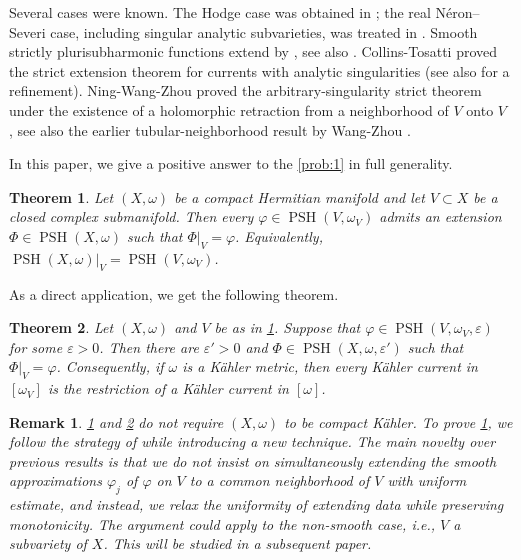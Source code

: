 \documentclass[12pt,reqno]{amsart}
\newtheorem{thm}{Theorem}[section]
\newtheorem{rem}{Remark}[section]
\newcommand{\PSH}{\operatorname{PSH}}
\newcommand{\restr}[2]{\left.#1\right|_{#2}}
\begin{document}
	Several cases were known. The Hodge case was obtained in \cite{CGZ13}; the real N\'eron--Severi case, including singular analytic subvarieties, was treated in \cite{CGZ22}. Smooth strictly plurisubharmonic functions extend by \cite[Proposition~2.1]{CGZ13}, see also \cite{Sch98}. Collins-Tosatti proved the strict extension theorem for currents with analytic singularities \cite{CT14} (see also \cite{DRWXZ26} for a refinement). Ning-Wang-Zhou proved the arbitrary-singularity strict theorem under the existence of a holomorphic retraction from a neighborhood of $V$ onto $V$ \cite{NWZ24}, see also the earlier tubular-neighborhood result by Wang-Zhou \cite{WZ}.
	
	In this paper, we give a positive answer to the \cref{prob:1} in  full generality.
	
	\begin{thm}\label{thm:main}
		Let $(X,\omega)$ be a compact Hermitian manifold and let $V\subset X$ be a closed complex submanifold. Then every $\varphi\in\PSH(V,\omega_V)$ admits an extension $\Phi\in\PSH(X,\omega)$ such that $\restr{\Phi}{V}=\varphi$.
		Equivalently, $\PSH(X,\omega)|_V=\PSH(V,\omega_V)$.
	\end{thm}
	
	As a direct application, we get the following theorem.
	
	\begin{thm}\label{thm:strict}
		Let $(X,\omega)$ and $V$ be as in \cref{thm:main}. Suppose that $\varphi\in\PSH(V,\omega_V,\varepsilon)$
		for some $\varepsilon>0$. Then there are $\varepsilon'>0$ and $\Phi\in\PSH(X,\omega,\varepsilon')$  such that
		$\restr{\Phi}{V}=\varphi$.
		Consequently, if $\omega$ is a K\"ahler metric, then every K\"ahler current in $[\omega_V]$ is the restriction of a K\"ahler current in $[\omega]$.
	\end{thm}
	\begin{rem}
		\cref{thm:main} and \cref{thm:strict} do not require $(X,\omega)$ to be compact K\"ahler.     To prove \cref{thm:main}, we follow the strategy of \cite{NWZ24} while introducing a new technique. The main novelty over previous results \cite{NWZ24} is that we do not insist on  simultaneously extending  the smooth approximations $\varphi_j$ of $\varphi$ on $V$ to a common neighborhood of $V$ with uniform estimate, and  instead, we relax the uniformity of extending data while preserving monotonicity. The  argument could apply to the non-smooth case, \textit{i.e.}, $V$ a subvariety of $X$. This will be studied in a subsequent paper.
	\end{rem}
	
\end{document}
